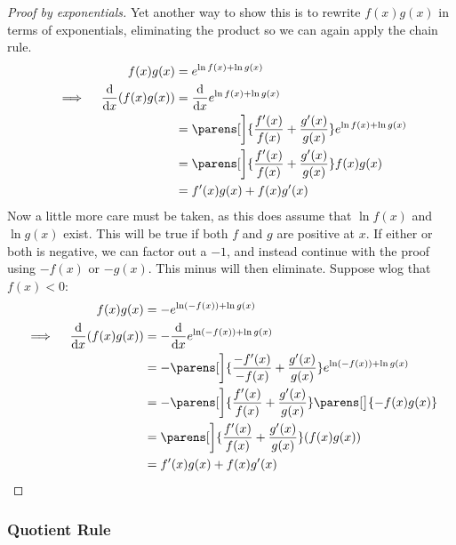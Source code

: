 \begin{proof}[Proof by exponentials]
 Yet another way to show this is to rewrite \(f(x)g(x)\) in terms of
 exponentials, eliminating the product so we can again apply the chain rule.
 \begin{alignat*}{2}
  && f(x)g(x) &= e^{\ln f(x) + \ln g(x)} \\
  &\implies{}& \dv{x} (f(x)g(x))
              &= \dv{x} e^{\ln f(x) + \ln g(x)} \\
  &&          &= \parens[\bigg]{\frac{f'(x)}{f(x)} + \frac{g'(x)}{g(x)}}
                   e^{\ln f(x) + \ln g(x)} \\
  &&          &= \parens[\bigg]{\frac{f'(x)}{f(x)} + \frac{g'(x)}{g(x)}}
                   f(x)g(x) \\
  &&          &= f'(x)g(x) + f(x)g'(x)
 \end{alignat*}
 Now a little more care must be taken, as this does assume that \(\ln f(x)\)
 and \(\ln g(x)\) exist. This will be true if both \(f\) and \(g\) are
 positive at \(x\). If either or both is negative, we can factor out a
 \(-1\), and instead continue with the proof using \(-f(x)\) or \(-g(x)\).
 This minus will then eliminate. Suppose wlog that \(f(x) < 0\):
 \begin{alignat*}{2}
  && f(x)g(x) &= -e^{\ln(-f(x)) + \ln g(x)} \\
  &\implies{}& \dv{x} (f(x)g(x))
              &= -\dv{x} e^{\ln(-f(x)) + \ln g(x)} \\
  &&          &= -\parens[\bigg]{\frac{-f'(x)}{-f(x)}
                               + \frac{g'(x)}{g(x)}}
                   e^{\ln(-f(x)) + \ln g(x)} \\
  &&          &= -\parens[\bigg]{\frac{f'(x)}{f(x)} + \frac{g'(x)}{g(x)}}
                   \parens[\big]{-f(x)g(x)} \\
  &&          &= \parens[\bigg]{\frac{f'(x)}{f(x)} + \frac{g'(x)}{g(x)}}
                   (f(x)g(x)) \\
  &&          &= f'(x)g(x) + f(x)g'(x) \qedhere
 \end{alignat*}
\end{proof}

\subsubsection{Quotient Rule} \label{sec_calc_quotient}

